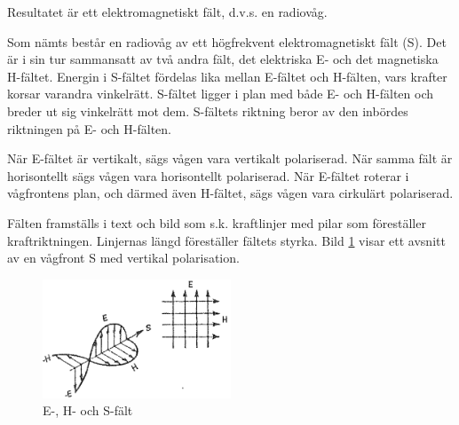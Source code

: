Resultatet är ett elektromagnetiskt fält, d.v.s. en radiovåg.

Som nämts består en radiovåg av ett högfrekvent elektromagnetiskt fält
(S). Det är i sin tur sammansatt av två andra fält, det elektriska E-
och det magnetiska H-fältet.  Energin i S-fältet fördelas lika mellan
E-fältet och H-fälten, vars krafter korsar varandra
vinkelrätt. S-fältet ligger i plan med både E- och H-fälten och breder
ut sig vinkelrätt mot dem. S-fältets riktning beror av den inbördes
riktningen på E- och H-fälten.

När E-fältet är vertikalt, sägs vågen vara vertikalt polariserad. När
samma fält är horisontellt sägs vågen vara horisontellt
polariserad. När E-fältet roterar i vågfrontens plan, och därmed även
H-fältet, sägs vågen vara cirkulärt polariserad.

Fälten framställs i text och bild som s.k. kraftlinjer med pilar som
föreställer kraftriktningen.
Linjernas längd föreställer fältets styrka.
Bild \ref{fig:BildII7-06} visar ett avsnitt av en vågfront S med vertikal
polarisation.

\begin{figure}
\includegraphics[width=0.5\textwidth]{images/cropped_pdfs/bild_2_7-06.pdf}
\caption{E-, H- och S-fält}
\label{fig:BildII7-06}
\end{figure}
